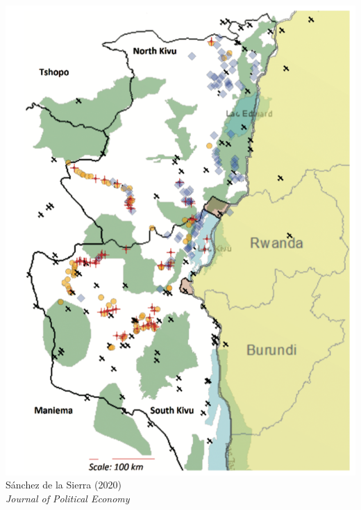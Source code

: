 \documentclass[aspectratio=43, handout]{beamer}
\begin{document}
\begin{frame}
\begin{minipage}{0.34\textwidth}
  \includegraphics[width = \textwidth]{img/sanchez_de_la_sierra_sample}\\
  {\footnotesize Sánchez de la Sierra (2020)\\\textit{Journal of Political Economy}\\}
\end{minipage}

\end{frame}
\end{document}
